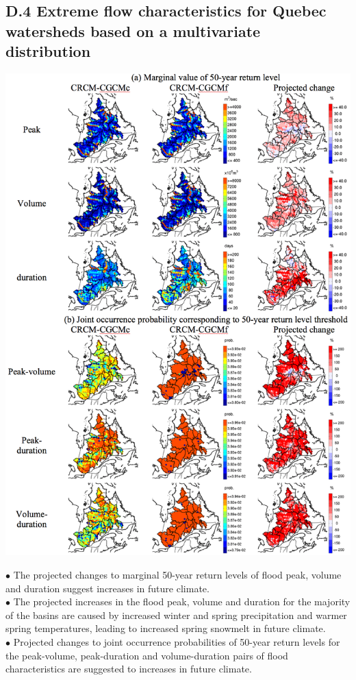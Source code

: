 \documentclass[a0,landscape]{a0poster}
\newcommand{\vspacebetweenbullets}{0.25cm}
\begin{document}
\begin{multicols*}{4}
\subsection*{D.4 Extreme flow characteristics for Quebec watersheds based on a multivariate distribution \citep{jeong2014copula}}
\begin{center}
   \includegraphics[width=0.6\linewidth]{cc_copula}
\end{center}

$\bullet$ The projected changes to marginal 50-year return levels of flood peak, volume and duration suggest increases in future climate. \\[\vspacebetweenbullets]
$\bullet$ The projected increases in the flood peak, volume and duration for the majority
of the basins are caused by increased winter and spring precipitation and warmer
spring temperatures, leading to increased spring snowmelt in future climate. \\[\vspacebetweenbullets]
$\bullet$ Projected changes to joint occurrence probabilities of 50-year return levels for
the peak-volume, peak-duration and volume-duration pairs of flood
characteristics are suggested to increases in future climate.


\end{multicols*}
\end{document}
